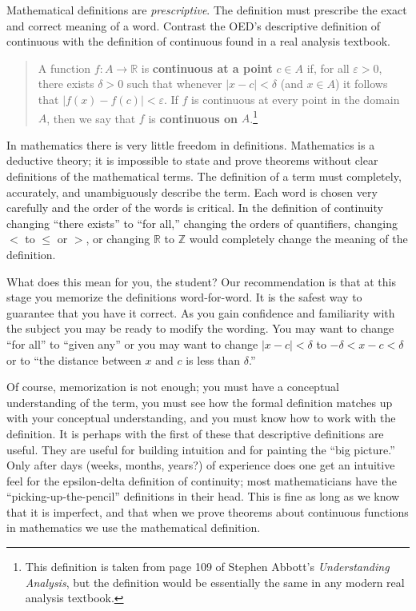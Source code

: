 Mathematical definitions are \emph{prescriptive}. The definition must prescribe the exact and correct meaning  of a word. Contrast the OED's descriptive definition of continuous with the definition of continuous found in a real analysis textbook.
\begin{quote}
A function $f:A\to \mathbb{R}$ is \textbf{continuous at a point} $c\in A$ if,  for all $\varepsilon>0$, there exists $\delta>0$ such that whenever $|x-c|<\delta$ (and $x\in A$) it follows that $|f(x)-f(c)|<\varepsilon$. If $f$ is continuous at every point in the domain $A$, then we say that $f$ is \textbf{continuous on} $A$.\footnote{This definition is taken from page 109 of Stephen Abbott's \emph{Understanding Analysis}, but the definition would be essentially the same in any modern real analysis textbook.} 
\end{quote}
In mathematics there is very little freedom in definitions. Mathematics is a deductive theory; it is impossible to state and prove theorems without clear definitions of the mathematical terms. The definition of a term must completely, accurately, and unambiguously describe the term. Each word is chosen very carefully and the order of the words is  critical. In the definition of continuity changing ``there exists'' to ``for all,'' changing the orders of quantifiers, changing $<$ to $\leq$ or $>$, or changing $\mathbb{R}$ to $\mathbb{Z}$ would completely change the meaning of the definition. 

What does this mean for you, the student? Our recommendation is that at this stage you memorize the definitions word-for-word. It is the safest way to guarantee that you have it correct. As you gain confidence and familiarity with the subject you may be ready to modify the wording. You may want to change ``for all'' to ``given any'' or you may want to change $|x-c|<\delta$ to $-\delta<x-c<\delta$ or to ``the distance between $x$ and $c$ is less than $\delta$.'' 

Of course, memorization is not enough; you must have a conceptual understanding of the term, you must see how the formal definition matches up with your conceptual understanding, and you must know how to work with the definition. It is perhaps with the first of these that descriptive definitions are useful. They are useful for building intuition and for painting the ``big picture.'' Only after days (weeks, months, years?) of experience does one get an intuitive feel for the epsilon-delta definition of continuity; most mathematicians have the ``picking-up-the-pencil'' definitions in their head. This is fine as long as we know that it is imperfect, and that when we prove theorems about continuous functions in mathematics we use the mathematical definition. 

